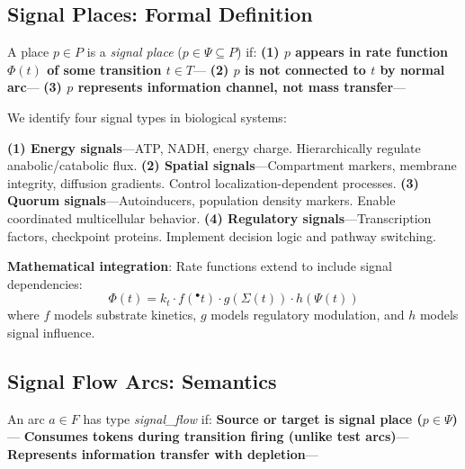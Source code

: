 \subsection{Signal Places: Formal Definition}

\begin{definition}
A place $p \in P$ is a \textit{signal place} ($p \in \Psi \subseteq P$) if:
\textbf{(1) $p$ appears in rate function $\Phi(t)$ of some transition $t \in T$}--- \textbf{(2) $p$ is \textbf{not} connected to $t$ by normal arc}--- \textbf{(3) $p$ represents information channel, not mass transfer}---
\end{definition}

\vspace{3pt}
\noindent We identify four signal types in biological systems:

\vspace{3pt}
\noindent\textbf{(1) \textbf{Energy signals}}---ATP, NADH, energy charge. Hierarchically regulate anabolic/catabolic flux. \textbf{(2) \textbf{Spatial signals}}---Compartment markers, membrane integrity, diffusion gradients. Control localization-dependent processes. \textbf{(3) \textbf{Quorum signals}}---Autoinducers, population density markers. Enable coordinated multicellular behavior. \textbf{(4) \textbf{Regulatory signals}}---Transcription factors, checkpoint proteins. Implement decision logic and pathway switching.

\vspace{3pt}
\noindent\textbf{Mathematical integration}: Rate functions extend to include signal dependencies:
\begin{equation}
\label{eq:rate_signal}
\Phi(t) = k_t \cdot f({}^\bullet t) \cdot g(\Sigma(t)) \cdot h(\Psi(t))
\end{equation}
where $f$ models substrate kinetics, $g$ models regulatory modulation, and $h$ models signal influence.

\subsection{Signal Flow Arcs: Semantics}

\begin{definition}
An arc $a \in F$ has type \textit{signal\_flow} if:
\textbf{Source or target is signal place ($p \in \Psi$)}--- \textbf{Consumes tokens during transition firing (unlike test arcs)}--- \textbf{Represents information transfer with depletion}---
\end{definition}

